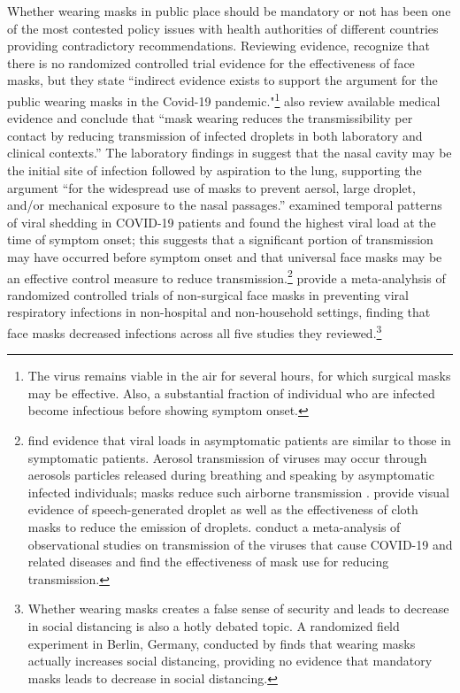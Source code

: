\documentclass[11pt,reqno,letter]{amsart}
\theoremstyle{definition}
\begin{document}
Whether wearing  masks in public place should be mandatory or not has been one of the most contested policy issues with health authorities of different countries providing contradictory recommendations. Reviewing evidence, \cite{Greenhalghm2020}  recognize that there is no randomized controlled trial evidence for the effectiveness of face masks,  but they state ``indirect evidence exists to support the argument for the public wearing masks in the Covid-19 pandemic."\footnote{The virus remains viable in the air for several hours, for which surgical masks may be effective. Also, a substantial fraction of individual who are infected become infectious before showing symptom onset.}
\cite{howard2020} also review available medical evidence and conclude that ``mask wearing reduces the transmissibility per contact by reducing transmission of infected droplets in both laboratory and clinical contexts.''  The laboratory findings in \cite{hou2020} suggest that the nasal cavity may be the initial site of infection followed by aspiration to the lung, supporting the argument  ``for the widespread use of masks to prevent aersol, large droplet, and/or mechanical exposure to the nasal passages.''   \cite{He2020} examined temporal patterns of viral shedding in COVID-19 patients and found the highest viral load at the time of symptom onset; this suggests that a significant portion of transmission may have occurred before symptom onset and that universal face masks may be an effective control measure to reduce transmission.\footnote{\cite{Lee2020} find evidence that viral loads in asymptomatic patients are similar to those in symptomatic patients. Aerosol transmission of viruses may occur through aerosols particles released during breathing and speaking by asymptomatic infected individuals; masks reduce such airborne transmission \citep{Prather2020}. \cite{Anfinrud2020} provide visual evidence of speech-generated droplet as well as the effectiveness of cloth masks to reduce the emission of droplets.   \cite{Chu2020} conduct a meta-analysis of observational studies on transmission of the viruses that cause COVID-19 and related diseases and find the effectiveness of mask use for reducing transmission. } \cite{ollila2020} provide a meta-analyhsis of randomized controlled trials of non-surgical face masks in preventing viral respiratory infections in non-hospital and non-household settings, finding that face masks decreased infections across all five studies they reviewed.\footnote{Whether wearing masks creates a false sense of security and leads to decrease in social distancing is also a hotly debated topic.  A randomized field experiment in Berlin, Germany, conducted by \cite{seres2020}  finds that wearing masks actually increases social distancing, providing no evidence that mandatory masks leads to decrease in social distancing.}
\end{document}

